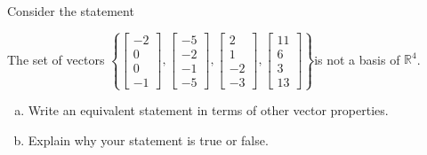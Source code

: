 
\begin{exerciseStatement}


Consider the statement 
\begin{center}\begin{minipage}{0.8\textwidth}
 The set of vectors \( \left\{ \left[\begin{array}{c}
-2 \\
0 \\
0 \\
-1
\end{array}\right] , \left[\begin{array}{c}
-5 \\
-2 \\
-1 \\
-5
\end{array}\right] , \left[\begin{array}{c}
2 \\
1 \\
-2 \\
-3
\end{array}\right] , \left[\begin{array}{c}
11 \\
6 \\
3 \\
13
\end{array}\right] \right\} \)is not a basis of \(\mathbb{R}^4\). 
\end{minipage}\end{center}
    


\begin{enumerate}[(a)]
\item  Write an equivalent statement in terms of other vector properties.
\item  Explain why your statement is true or false.
\end{enumerate}
    
\end{exerciseStatement}
    
